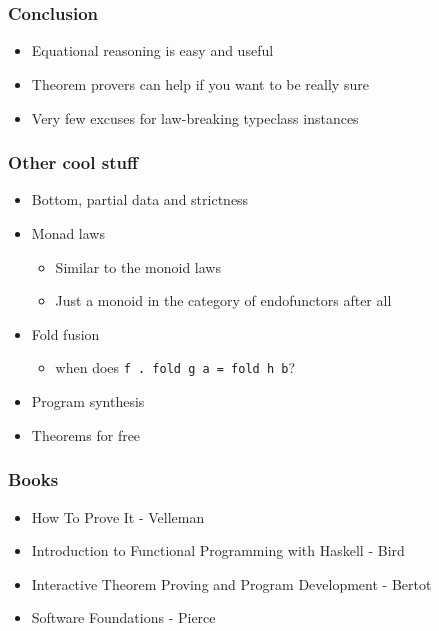 \documentclass{beamer}
\begin{document}
\section*{}

\begin{frame}
    \frametitle{Conclusion}
\begin{itemize}
\item Equational reasoning is easy and useful
\item Theorem provers can help if you want to be really sure
\item Very few excuses for law-breaking typeclass instances
\end{itemize}
\end{frame}

\begin{frame}
    \frametitle{Other cool stuff}
\begin{itemize}
\item Bottom, partial data and strictness
\item Monad laws
\begin{itemize}
    \item Similar to the monoid laws
    \item Just a monoid in the category of endofunctors after all
\end{itemize}
\item Fold fusion
\begin{itemize}
    \item when does \Verb?f . fold g a = fold h b??
\end{itemize}
\item Program synthesis
\item Theorems for free
\end{itemize}
\end{frame}

\begin{frame}
    \frametitle{Books}
\begin{itemize}
\item How To Prove It - Velleman
\item Introduction to Functional Programming with Haskell - Bird
\item Interactive Theorem Proving and Program Development - Bertot
\item Software Foundations - Pierce
\end{itemize}
\end{frame}
\end{document}
